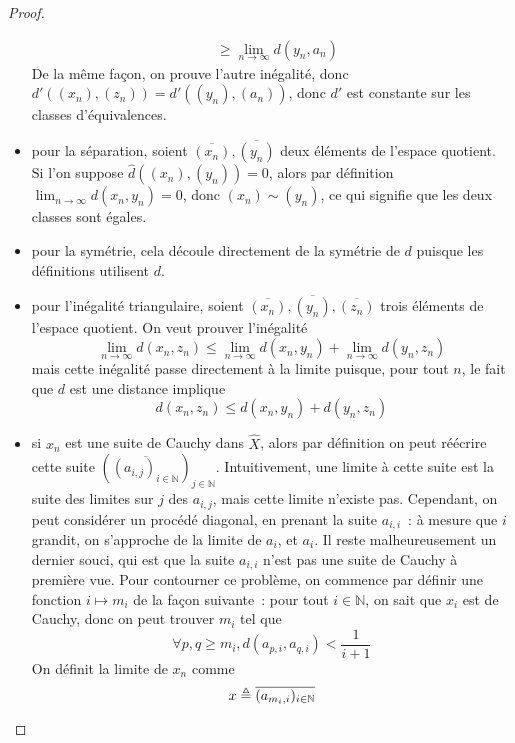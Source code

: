 \begin{proof}
\begin{itemize}
\begin{align*}
      &\geq \lim_{n\to \infty} d(y_n,a_n)
    \end{align*}
    De la même façon, on prouve l'autre inégalité, donc
    $d'((x_n),(z_n)) = d'((y_n),(a_n))$, donc $d'$ est constante sur les
    classes d'équivalences.
  \item pour la séparation, soient $\overline{(x_n)},\overline{(y_n)}$ deux
    éléments de l'espace quotient. Si l'on suppose $\hat d((x_n),(y_n)) = 0$,
    alors par définition $\displaystyle\lim_{n\to\infty} d(x_n,y_n) = 0$, donc
    $(x_n)\sim (y_n)$, ce qui
    signifie que les deux classes sont égales.
  \item pour la symétrie, cela découle directement de la symétrie de $d$ puisque
    les définitions utilisent $d$.
  \item pour l'inégalité triangulaire, soient
    $\overline{(x_n)},\overline{(y_n)},\overline{(z_n)}$ trois éléments de
    l'espace quotient. On veut prouver l'inégalité
    \[\lim_{n\to\infty} d(x_n,z_n) \leq \lim_{n\to\infty} d(x_n,y_n) +
    \lim_{n\to\infty} d(y_n,z_n)\]
    mais cette inégalité passe directement à la limite puisque, pour tout $n$,
    le fait que $d$ est une distance implique
    \[d(x_n,z_n) \leq d(x_n,y_n) + d(y_n,z_n)\]
  \item si $x_n$ est une suite de Cauchy dans $\hat X$, alors par définition on
    peut réécrire cette suite
    $(\overline{(a_{i,j})_{i \in \mathbb N}})_{j \in \mathbb N}$. Intuitivement, une
    limite à cette suite est la suite des limites sur $j$ des $a_{i,j}$, mais
    cette limite n'existe pas. Cependant, on peut considérer un procédé
    diagonal, en prenant la suite $a_{i,i}$~: à mesure que $i$ grandit, on
    s'approche de la limite de $a_i$, et $a_i$. Il reste malheureusement un
    dernier souci, qui est que la suite $a_{i,i}$ n'est pas une suite de
    Cauchy à première vue. Pour contourner ce problème, on commence par
    définir une fonction $i \mapsto m_i$ de la façon suivante~: pour tout
    $i \in \mathbb N$, on sait que $x_i$ est de Cauchy, donc on peut trouver
    $m_i$ tel que
    \[\forall p,q \geq m_i, d(a_{p,i},a_{q,i}) < \frac{1}{i + 1}\]
    On définit la limite de $x_n$ comme
    \[x \triangleq \overline{(a_{m_i,i})_{i\in \mathbb N}}\]


\end{itemize}
\end{proof}

